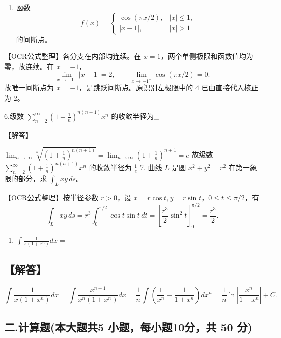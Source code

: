 \documentclass[11pt,fontset=fandol]{ctexart}
\providecommand{\tightlist}{\setlength{\itemsep}{0pt}\setlength{\parskip}{0pt}}
\begin{document}
\begin{enumerate}
\def\labelenumi{\arabic{enumi}.}
\setcounter{enumi}{4}
\tightlist
\item
  函数 \[
  f(x)=\begin{cases}\cos(\pi x/2),&|x|\le1,\\|x-1|,&|x|>1\end{cases}
  \] 的间断点。
\end{enumerate}

【OCR公式整理】各分支在内部均连续。在
\(x=1\)，两个单侧极限和函数值均为零，故连续。在 \(x=-1\)， \[
\lim_{x\to-1^-}|x-1|=2,\qquad
\lim_{x\to-1^+}\cos(\pi x/2)=0.
\] 故唯一间断点为 \(x=-1\)，是跳跃间断点。原识别左极限中的 \(4\)
已由直接代入核正为 \(2\)。

6.级数
\(\sum _ { n = 2 } ^ { \infty } ( 1 + { \frac { 1 } { n } } ) ^ { n ( n + 1 ) } x ^ { n }\)
的收敛半径为\_

【解答】

\(\lim _ { n \to \infty } \sqrt [ n ] { ( 1 + \frac { 1 } { n } ) ^ { n ( n + 1 ) } } = \lim _ { n \to \infty } ( 1 + \frac { 1 } { n } ) ^ { n + 1 } = e\)
故级数
\(\sum _ { n = 2 } ^ { \infty } ( 1 + { \frac { 1 } { n } } ) ^ { n ( n + 1 ) } x ^ { n }\)
的收敛半径为 \(\frac { 1 } { e }\) 7. 曲线 \(L\) 是圆 \(x^2+y^2=r^2\)
在第一象限的部分，求 \(\int_Lxy\,ds\)。

【OCR公式整理】按半径参数 \(r>0\)，设
\(x=r\cos t,y=r\sin t\)，\(0\le t\le\pi/2\)，有 \[
\int_Lxy\,ds=r^3\int_0^{\pi/2}\cos t\sin t\,dt
=\left[\frac{r^3}{2}\sin^2t\right]_0^{\pi/2}=\frac{r^3}{2}.
\]

\begin{enumerate}
\def\labelenumi{\arabic{enumi}.}
\setcounter{enumi}{7}
\tightlist
\item
  \(\int { \frac { 1 } { x ( 1 + x ^ { n } ) } } d x =\)
\end{enumerate}

\subsection{【解答】}\label{ux89e3ux7b54-2}

\[
\int { \frac { 1 } { x ( 1 + x ^ { n } ) } } d x = \int { \frac { x ^ { n - 1 } } { x ^ { n } ( 1 + x ^ { n } ) } } d x = { \frac { 1 } { n } } \int ( { \frac { 1 } { x ^ { n } } } - { \frac { 1 } { 1 + x ^ { n } } } ) d x ^ { n } = { \frac { 1 } { n } } \ln \left| { \frac { x ^ { n } } { 1 + x ^ { n } } } \right| + C .
\]

\subsection{二.计算题(本大题共5 小题，每小题10分，共 50
分)}\label{ux4e8c.ux8ba1ux7b97ux9898ux672cux5927ux9898ux51715-ux5c0fux9898ux6bcfux5c0fux989810ux5206ux5171-50-ux5206}
\end{document}

